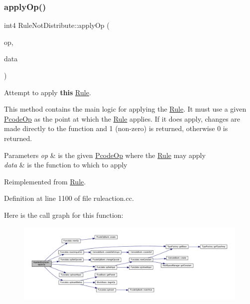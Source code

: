 \subsubsection{\texorpdfstring{applyOp()}{applyOp()}}
{\footnotesize\ttfamily int4 Rule\+Not\+Distribute\+::apply\+Op (\begin{DoxyParamCaption}\item[{\mbox{\hyperlink{class_pcode_op}{Pcode\+Op}} $\ast$}]{op,  }\item[{\mbox{\hyperlink{class_funcdata}{Funcdata}} \&}]{data }\end{DoxyParamCaption})\hspace{0.3cm}{\ttfamily [virtual]}}



Attempt to apply {\bfseries{this}} \mbox{\hyperlink{class_rule}{Rule}}. 

This method contains the main logic for applying the \mbox{\hyperlink{class_rule}{Rule}}. It must use a given \mbox{\hyperlink{class_pcode_op}{Pcode\+Op}} as the point at which the \mbox{\hyperlink{class_rule}{Rule}} applies. If it does apply, changes are made directly to the function and 1 (non-\/zero) is returned, otherwise 0 is returned. 
\begin{DoxyParams}{Parameters}
{\em op} & is the given \mbox{\hyperlink{class_pcode_op}{Pcode\+Op}} where the \mbox{\hyperlink{class_rule}{Rule}} may apply \\
\hline
{\em data} & is the function to which to apply \\
\hline
\end{DoxyParams}


Reimplemented from \mbox{\hyperlink{class_rule_a4e3e61f066670175009f60fb9dc60848}{Rule}}.



Definition at line 1100 of file ruleaction.\+cc.

Here is the call graph for this function\+:
\nopagebreak
\begin{figure}[H]
\begin{center}
\leavevmode
\includegraphics[width=350pt]{class_rule_not_distribute_af010b4c83cf55e7c1c858941f72e048b_cgraph}
\end{center}
\end{figure}
\mbox{\label{class_rule_not_distribute_a15ef3668c177ca8008f4ca27b627c9c3}} 
